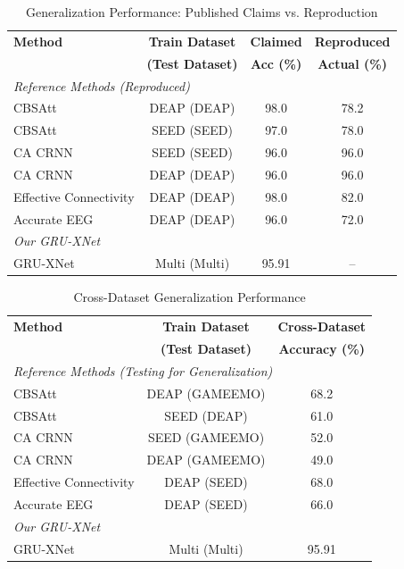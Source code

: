 \documentclass[conference]{IEEEtran}
\begin{document}
\begin{table}[!t]
\centering
\caption{Generalization Performance: Published Claims vs. Reproduction}
\label{tab:generalization_comparison}
\begin{tabular}{lccc}
\toprule
\textbf{Method} & \textbf{Train Dataset} & \textbf{Claimed} & \textbf{Reproduced} \\
 & \textbf{(Test Dataset)} & \textbf{Acc (\%)} & \textbf{Actual (\%)} \\
\midrule
\multicolumn{4}{l}{\textit{Reference Methods (Reproduced)}} \\
CBSAtt & DEAP (DEAP) & 98.0 & 78.2 \\
CBSAtt & SEED (SEED) & 97.0 & 78.0 \\
CA CRNN & SEED (SEED) & 96.0 & 96.0 \\
CA CRNN & DEAP (DEAP) & 96.0 & 96.0 \\
Effective Connectivity & DEAP (DEAP) & 98.0 & 82.0 \\
Accurate EEG & DEAP (DEAP) & 96.0 & 72.0 \\
\midrule
\multicolumn{4}{l}{\textit{Our GRU-XNet}} \\
GRU-XNet & Multi (Multi) & 95.91 & -- \\
\bottomrule
\end{tabular}
\end{table}

\begin{table}[!t]
\centering
\caption{Cross-Dataset Generalization Performance}
\label{tab:crossdataset_comparison}
\begin{tabular}{lcc}
\toprule
\textbf{Method} & \textbf{Train Dataset}  & \textbf{Cross-Dataset} \\
 & \textbf{(Test Dataset)}  & \textbf{Accuracy (\%)} \\
\midrule
\multicolumn{3}{l}{\textit{Reference Methods (Testing for Generalization)}} \\
CBSAtt & DEAP (GAMEEMO)  & 68.2 \\
CBSAtt & SEED (DEAP)  & 61.0 \\
CA CRNN & SEED (GAMEEMO)  & 52.0 \\
CA CRNN & DEAP (GAMEEMO) & 49.0 \\
Effective Connectivity & DEAP (SEED)  & 68.0 \\
Accurate EEG & DEAP (SEED) & 66.0 \\
\midrule
\multicolumn{3}{l}{\textit{Our GRU-XNet}} \\
GRU-XNet & Multi (Multi) & 95.91\\
\bottomrule
\end{tabular}
\end{table}
\end{document}
